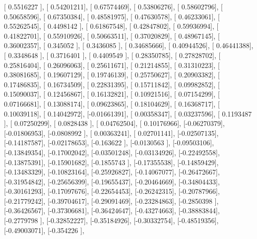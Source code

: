\documentclass{article}
\begin{document}
       [ 0.5516227 ],
       [ 0.54201211],
       [ 0.67574469],
       [ 0.53806276],
       [ 0.58602796],
       [ 0.50658596],
       [ 0.67350384],
       [ 0.48581975],
       [ 0.47630578],
       [ 0.46233061],
       [ 0.55262545],
       [ 0.4498142 ],
       [ 0.61867548],
       [ 0.42847802],
       [ 0.59936994],
       [ 0.41822701],
       [ 0.55910926],
       [ 0.50663511],
       [ 0.37020829],
       [ 0.48967145],
       [ 0.36002357],
       [ 0.345052  ],
       [ 0.3436085 ],
       [ 0.34685666],
       [ 0.40944526],
       [ 0.46441388],
       [ 0.3348648 ],
       [ 0.3716401 ],
       [ 0.4409549 ],
       [ 0.28350785],
       [ 0.27828702],
       [ 0.25816404],
       [ 0.26096063],
       [ 0.25611671],
       [ 0.21214855],
       [ 0.31310223],
       [ 0.38081685],
       [ 0.19607129],
       [ 0.19746139],
       [ 0.25750627],
       [ 0.20903382],
       [ 0.17486835],
       [ 0.16734509],
       [ 0.22831395],
       [ 0.15711842],
       [ 0.09982852],
       [ 0.15090037],
       [ 0.12456867],
       [ 0.16132821],
       [ 0.10921516],
       [ 0.07154299],
       [ 0.07166681],
       [ 0.13088174],
       [ 0.09623865],
       [ 0.18104629],
       [ 0.16368717],
       [ 0.10039118],
       [ 0.14042972],
       [-0.01661391],
       [ 0.00358347],
       [ 0.03237596],
       [ 0.1193487 ],
       [ 0.07250299],
       [ 0.0828438 ],
       [ 0.04762504],
       [ 0.10176966],
       [-0.06270379],
       [-0.01806953],
       [-0.0808992 ],
       [ 0.00363241],
       [ 0.02701141],
       [-0.02507135],
       [-0.14187587],
       [-0.02178653],
       [-0.163622  ],
       [-0.0130563 ],
       [-0.09503106],
       [-0.13849354],
       [-0.17002042],
       [-0.03501248],
       [-0.03134926],
       [-0.22492558],
       [-0.13875391],
       [-0.15901682],
       [-0.1855743 ],
       [-0.17355538],
       [-0.14859429],
       [-0.13483329],
       [-0.10823164],
       [-0.25926827],
       [-0.14067077],
       [-0.26472667],
       [-0.31954842],
       [-0.25656399],
       [-0.19655437],
       [-0.20464669],
       [-0.34804433],
       [-0.30161293],
       [-0.17097676],
       [-0.22654453],
       [-0.26242315],
       [-0.20787966],
       [-0.21779242],
       [-0.39704617],
       [-0.29091469],
       [-0.23284863],
       [-0.2850398 ],
       [-0.36426567],
       [-0.37306681],
       [-0.36424647],
       [-0.43274663],
       [-0.38883844],
       [-0.2779798 ],
       [-0.32852227],
       [-0.35184926],
       [-0.30332754],
       [-0.48519356],
       [-0.49003071],
       [-0.354226  ],
\end{document}
